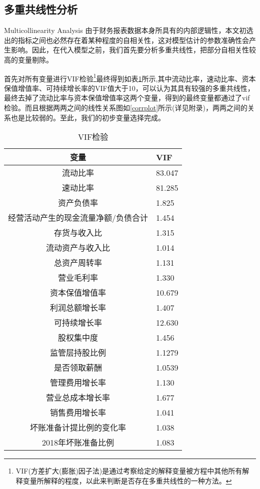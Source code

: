 \subsection{多重共线性分析}{Multicollinearity Analysis}
由于财务报表数据本身所具有的内部逻辑性，本文初选出的指标之间也必然存在着某种程度的自相关性，这对模型估计的参数准确性会产生影响。因此，在代入模型之前，我们首先要分析多重共线性，把部分自相关性较高的变量剔除。

首先对所有变量进行VIF检验\footnote{VIF(方差扩大(膨胀)因子法)是通过考察给定的解释变量被方程中其他所有解释变量所解释的程度，以此来判断是否存在多重共线性的一种方法。}最终得到如表\ref{vif}所示,其中流动比率，速动比率、资本保值增值率、可持续增长率的VIF值大于10，可以认为其具有较强的多重共线性，最终去掉了流动比率与资本保值增值率这两个变量，得到的最终变量都通过了vif检验。而且根据两两之间的线性关系图如\ref{corrplot}所示(详见附录)，两两之间的关系也是比较弱的。至此，我们的初步变量选择完成。


\begin{table}[]
	\centering
	\caption{VIF检验}
	\label{vif}
	\begin{tabular}{@{}c|l@{}}
	\toprule
	变量                 & VIF     \\ \toprule
	流动比率               & 83.047 \\
	速动比率               & 81.285 \\
	资产负债率              & 1.825  \\
	经营活动产生的现金流量净额/负债合计 & 1.454  \\
	存货与收入比             & 1.315  \\
	流动资产与收入比           & 1.014  \\
	总资产周转率             & 1.131  \\
	营业毛利率              & 1.330  \\
	资本保值增值率            & 10.679  \\
	利润总额增长率            & 1.407  \\
	可持续增长率             & 12.630 \\
	股权集中度              & 1.456  \\
	监管层持股比例            & 1.1279  \\
	是否领取薪酬             & 1.0539  \\
	管理费用增长率            & 1.130  \\
	营业总成本增长率           & 1.677  \\
	销售费用增长率               & 1.041  \\
	坏账准备计提比例的变化率       & 1.038  \\
	2018年坏账准备比例        & 1.083  \\ \bottomrule
	\end{tabular}
	\end{table}
